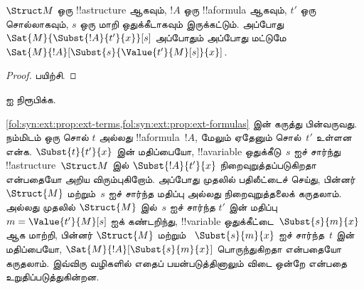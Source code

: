 \documentclass[../../../include/open-logic-section]{subfiles}
\begin{document}
\begin{prop} $\Struct M$ ஒரு
!!a{structure} ஆகவும், $!A$ ஒரு !!a{formula} ஆகவும், $t'$ ஒரு
சொல்லாகவும், $s$ ஒரு மாறி ஒதுக்கீடாகவும் இருக்கட்டும். அப்போது
$\Sat{M}{\Subst{!A}{t'}{x}}[s]$ அப்போதும் அப்போது மட்டுமே
$\Sat{M}{!A}[\Subst{s}{\Value{t'}{M}[s]}{x}]$.
\end{prop}

\begin{proof}
பயிற்சி.
\end{proof}

\begin{prob}
 ஐ நிரூபிக்க.
\end{prob}

\begin{explain}
  \cref{fol:syn:ext:prop:ext-terms,fol:syn:ext:prop:ext-formulas} இன்
  கருத்து பின்வருவது.
  நம்மிடம் ஒரு சொல் $t$ அல்லது !!a{formula}~$!A$, மேலும் ஏதேனும்
  சொல்~$t'$ உள்ளன என்க. $\Subst{t}{t'}{x}$ இன் மதிப்பையோ,
  !!a{variable} ஒதுக்கீடு~$s$ ஐச் சார்ந்து
  !!a{structure}~$\Struct M$ இல் $\Subst{!A}{t'}{x}$
  நிறைவுறுத்தப்படுகிறதா என்பதையோ அறிய விரும்புகிறோம். அப்போது முதலில்
  பதிலீட்டைச் செய்து, பின்னர் $\Struct{M}$ மற்றும்~$s$ ஐச் சார்ந்த
  மதிப்பு அல்லது நிறைவுறுத்தலைக் கருதலாம். அல்லது முதலில்
  $\Struct{M}$ இல்~$s$ ஐச் சார்ந்த $t'$ இன்
  மதிப்பு~$m = \Value{t'}{M}[s]$ ஐக் கண்டறிந்து, !!{variable}
  ஒதுக்கீட்டை~$\Subst{s}{m}{x}$ ஆக மாற்றி, பின்னர் $\Struct{M}$ மற்றும்
  ~$\Subst{s}{m}{x}$ ஐச் சார்ந்த~$t$ இன் மதிப்பையோ,
  $\Sat{M}{!A}[\Subst{s}{m}{x}]$ பொருந்துகிறதா என்பதையோ கருதலாம்.
  இவ்விரு வழிகளில் எதைப் பயன்படுத்தினாலும் விடை ஒன்றே என்பதை
  உறுதிப்படுத்துகின்றன.
\end{explain}
\end{document}
